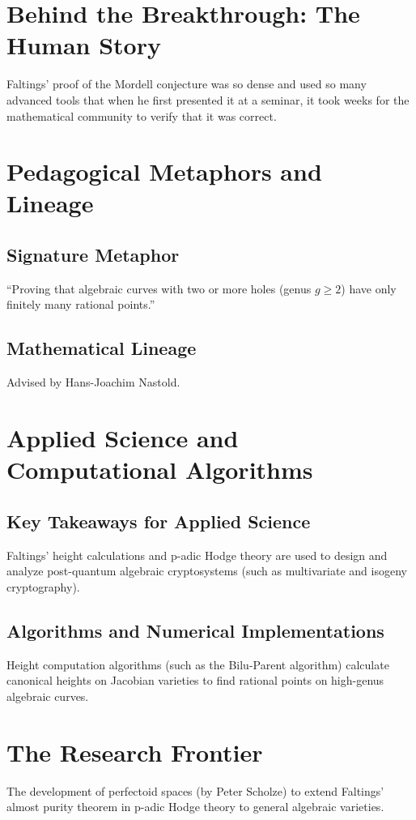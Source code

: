 \section{Behind the Breakthrough: The Human Story}
Faltings' proof of the Mordell conjecture was so dense and used so many advanced tools that when he first presented it at a seminar, it took weeks for the mathematical community to verify that it was correct.

\section{Pedagogical Metaphors and Lineage}
\subsection{Signature Metaphor}
``Proving that algebraic curves with two or more holes (genus $g \geq 2$) have only finitely many rational points.''

\subsection{Mathematical Lineage}
Advised by Hans-Joachim Nastold.

\section{Applied Science and Computational Algorithms}
\subsection{Key Takeaways for Applied Science}
Faltings' height calculations and p-adic Hodge theory are used to design and analyze post-quantum algebraic cryptosystems (such as multivariate and isogeny cryptography).

\subsection{Algorithms and Numerical Implementations}
Height computation algorithms (such as the Bilu-Parent algorithm) calculate canonical heights on Jacobian varieties to find rational points on high-genus algebraic curves.

\section{The Research Frontier}
The development of perfectoid spaces (by Peter Scholze) to extend Faltings' almost purity theorem in p-adic Hodge theory to general algebraic varieties.

